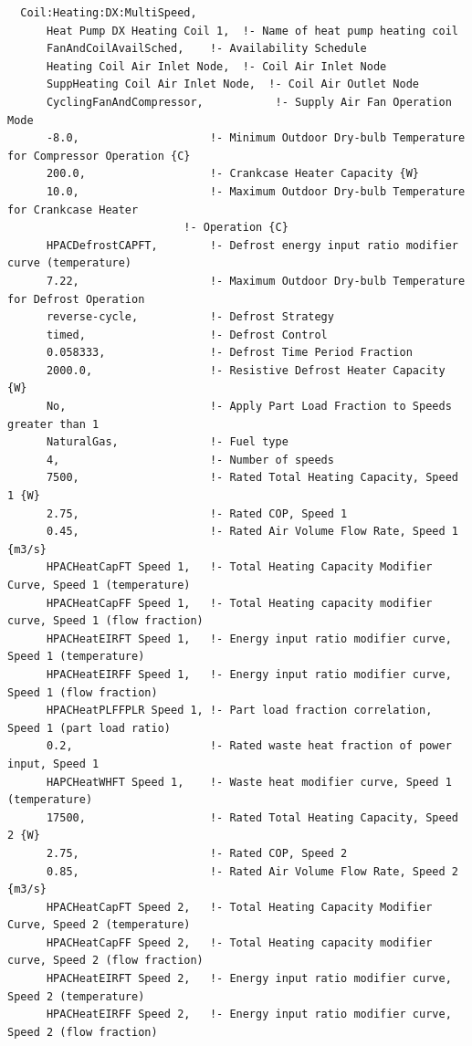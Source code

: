 \begin{lstlisting}
  Coil:Heating:DX:MultiSpeed,
      Heat Pump DX Heating Coil 1,  !- Name of heat pump heating coil
      FanAndCoilAvailSched,    !- Availability Schedule
      Heating Coil Air Inlet Node,  !- Coil Air Inlet Node
      SuppHeating Coil Air Inlet Node,  !- Coil Air Outlet Node
      CyclingFanAndCompressor,           !- Supply Air Fan Operation Mode
      -8.0,                    !- Minimum Outdoor Dry-bulb Temperature for Compressor Operation {C}
      200.0,                   !- Crankcase Heater Capacity {W}
      10.0,                    !- Maximum Outdoor Dry-bulb Temperature for Crankcase Heater
                           !- Operation {C}
      HPACDefrostCAPFT,        !- Defrost energy input ratio modifier curve (temperature)
      7.22,                    !- Maximum Outdoor Dry-bulb Temperature for Defrost Operation
      reverse-cycle,           !- Defrost Strategy
      timed,                   !- Defrost Control
      0.058333,                !- Defrost Time Period Fraction
      2000.0,                  !- Resistive Defrost Heater Capacity {W}
      No,                      !- Apply Part Load Fraction to Speeds greater than 1
      NaturalGas,              !- Fuel type
      4,                       !- Number of speeds
      7500,                    !- Rated Total Heating Capacity, Speed 1 {W}
      2.75,                    !- Rated COP, Speed 1
      0.45,                    !- Rated Air Volume Flow Rate, Speed 1 {m3/s}
      HPACHeatCapFT Speed 1,   !- Total Heating Capacity Modifier Curve, Speed 1 (temperature)
      HPACHeatCapFF Speed 1,   !- Total Heating capacity modifier curve, Speed 1 (flow fraction)
      HPACHeatEIRFT Speed 1,   !- Energy input ratio modifier curve, Speed 1 (temperature)
      HPACHeatEIRFF Speed 1,   !- Energy input ratio modifier curve, Speed 1 (flow fraction)
      HPACHeatPLFFPLR Speed 1, !- Part load fraction correlation, Speed 1 (part load ratio)
      0.2,                     !- Rated waste heat fraction of power input, Speed 1
      HAPCHeatWHFT Speed 1,    !- Waste heat modifier curve, Speed 1 (temperature)
      17500,                   !- Rated Total Heating Capacity, Speed 2 {W}
      2.75,                    !- Rated COP, Speed 2
      0.85,                    !- Rated Air Volume Flow Rate, Speed 2 {m3/s}
      HPACHeatCapFT Speed 2,   !- Total Heating Capacity Modifier Curve, Speed 2 (temperature)
      HPACHeatCapFF Speed 2,   !- Total Heating capacity modifier curve, Speed 2 (flow fraction)
      HPACHeatEIRFT Speed 2,   !- Energy input ratio modifier curve, Speed 2 (temperature)
      HPACHeatEIRFF Speed 2,   !- Energy input ratio modifier curve, Speed 2 (flow fraction)

\end{lstlisting}

